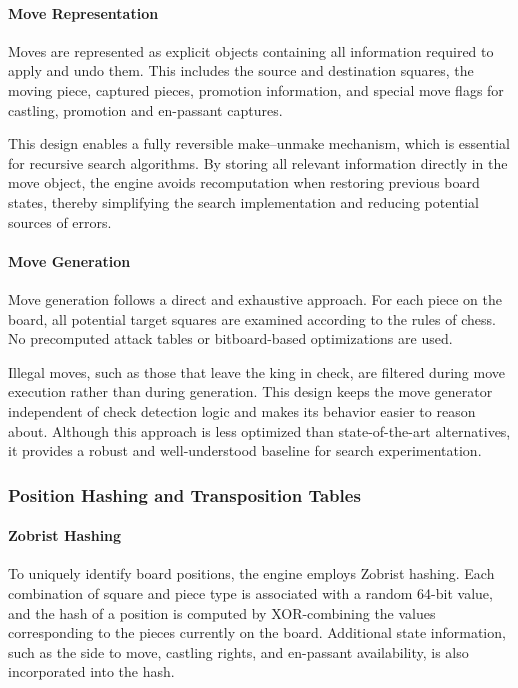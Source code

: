 \paragraph{Move Representation}
Moves are represented as explicit objects containing all information required to
apply and undo them. This includes the source and destination squares, the moving
piece, captured pieces, promotion information, and special move flags for
castling, promotion and en-passant captures.

This design enables a fully reversible make--unmake mechanism, which is essential
for recursive search algorithms. By storing all relevant information directly in
the move object, the engine avoids recomputation when restoring previous board
states, thereby simplifying the search implementation and reducing potential
sources of errors.

\paragraph{Move Generation}
Move generation follows a direct and exhaustive approach. For each piece on the
board, all potential target squares are examined according to the rules of
chess. No precomputed attack tables or bitboard-based optimizations are used.

Illegal moves, such as those that leave the king in check, are filtered during
move execution rather than during generation. This design keeps the move
generator independent of check detection logic and makes its behavior easier to
reason about. Although this approach is less optimized than state-of-the-art
alternatives, it provides a robust and well-understood baseline for search
experimentation.

\subsubsection{Position Hashing and Transposition Tables}

\paragraph{Zobrist Hashing}
To uniquely identify board positions, the engine employs Zobrist hashing. Each
combination of square and piece type is associated with a random 64-bit value,
and the hash of a position is computed by XOR-combining the values corresponding
to the pieces currently on the board. Additional state information, such as the
side to move, castling rights, and en-passant availability, is also incorporated
into the hash.

